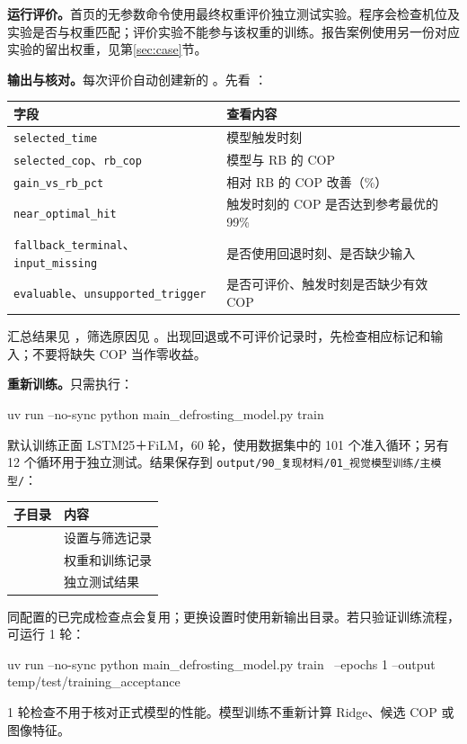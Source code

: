 \documentclass[UTF8,11pt,a4paper,fontset=fandol]{ctexart}
\newcommand{\code}[1]{\nolinkurl{#1}}
\begin{document}
\textbf{运行评价。}首页的无参数命令使用最终权重评价独立测试实验。程序会检查机位及实验是否与权重匹配；评价实验不能参与该权重的训练。报告案例使用另一份对应实验的留出权重，见第\ref{sec:case}节。

\textbf{输出与核对。}每次评价自动创建新的 。先看 ：
\begin{center}
\begin{tabularx}{\textwidth}{p{73mm}Y}
\toprule
字段 & 查看内容 \\
\midrule
\code{selected_time} & 模型触发时刻 \\
\code{selected_cop}、\code{rb_cop} & 模型与 RB 的 COP \\
\code{gain_vs_rb_pct} & 相对 RB 的 COP 改善（\%） \\
\code{near_optimal_hit} & 触发时刻的 COP 是否达到参考最优的 99\% \\
\code{fallback_terminal}、\code{input_missing} & 是否使用回退时刻、是否缺少输入 \\
\code{evaluable}、\code{unsupported_trigger} & 是否可评价、触发时刻是否缺少有效 COP \\
\bottomrule
\end{tabularx}
\end{center}
汇总结果见 ，筛选原因见 。出现回退或不可评价记录时，先检查相应标记和输入；不要将缺失 COP 当作零收益。

\textbf{重新训练。}只需执行：
\begin{Code}
uv run --no-sync python main_defrosting_model.py train
\end{Code}
默认训练正面 LSTM25＋FiLM，60 轮，使用数据集中的 101 个准入循环；另有 12 个循环用于独立测试。结果保存到 \texttt{output/90\_复现材料/01\_视觉模型训练/主模型/}：
\begin{center}
\begin{tabularx}{\textwidth}{p{70mm}Y}
\toprule
子目录 & 内容 \\
\midrule
{} & 设置与筛选记录 \\
 & 权重和训练记录 \\
 & 独立测试结果 \\
\bottomrule
\end{tabularx}
\end{center}
同配置的已完成检查点会复用；更换设置时使用新输出目录。若只验证训练流程，可运行 1 轮：
\begin{Code}
uv run --no-sync python main_defrosting_model.py train \
  --epochs 1 --output temp/test/training_acceptance
\end{Code}
1 轮检查不用于核对正式模型的性能。模型训练不重新计算 Ridge、候选 COP 或图像特征。
\end{document}
